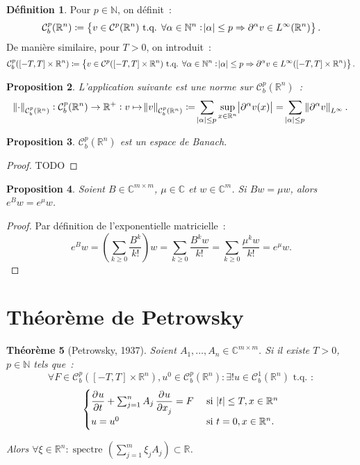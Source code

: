 \documentclass{report}
\DeclareMathOperator{\spectreOperator}{spectre\!}
\newcommand{\C}{{\mathbb C}}
\newcommand{\R}{{\mathbb R}}
\newcommand{\N}{{\mathbb N}}
\newcommand{\tq}{\text{ t.q. }}
\newcommand{\st}{\tq}
\newcommand{\pinfty}{{+\infty}}
\newcommand{\spectre}[1]{{\spectreOperator\left(#1\right)}}
\newtheorem{thm}{Théorème}[chapter]
\newtheorem{prp}[thm]{Proposition}
\theoremstyle{definition}
\newtheorem{déf}[thm]{Définition}
\theoremstyle{remark}
\begin{document}
\begin{déf} Pour $p \in \N$, on définit~:
\[\mathcal C^p_b(\R^n) \coloneqq \left\{v \in \mathcal C^p(\R^n) \st \forall \alpha \in \N^n : \abs \alpha \leq p \Rightarrow \partial^\alpha v \in L^\infty(\R^n)\right\}.\]
De manière similaire, pour $T > 0$, on introduit~:
\[\mathcal C^p_b([-T, T] \times \R^n) \coloneqq \left\{v \in \mathcal C^p([-T, T] \times \R^n) \st \forall \alpha \in \N^n : \abs \alpha \leq p \Rightarrow \partial^\alpha v \in L^\infty([-T, T] \times \R^n)\right\}.\]
\end{déf}

\begin{prp} L'application suivante est une norme sur $\mathcal C^p_b(\R^n)$~:
\[\norm \cdot_{\mathcal C^p_b(\R^n)} : \mathcal C^p_b(\R^n) \to \R^+ : v \mapsto \norm v_{\mathcal C^p_b(\R^n)} \coloneqq \sum_{\abs \alpha \leq p}\sup_{x \in \R^n}\abs {\partial^\alpha v(x)}
= \sum_{\abs\alpha \leq p}\norm {\partial^\alpha v}_{L^\infty}.\]
\end{prp}

\begin{prp}\label{prp:C^p_b Banach} $\mathcal C^p_b(\R^n)$ est un espace de Banach.
\end{prp}

\begin{proof}
TODO
\end{proof}

\begin{prp} Soient $B \in \C^{m \times m}$, $\mu \in \C$ et $w \in \C^m$. Si $Bw = \mu w$, alors $e^Bw = e^\mu w$.
\end{prp}

\begin{proof} Par définition de l'exponentielle matricielle~:
\[e^Bw = \left(\sum_{k \geq 0}\frac {B^k}{k!}\right)w = \sum_{k \geq 0}\frac {B^kw}{k!} = \sum_{k \geq 0}\frac {\mu^kw}{k!} = e^\mu w.\]
\end{proof}

\section{Théorème de Petrowsky}
\begin{thm}[Petrowsky, 1937] Soient $A_1, \ldots, A_n \in \C^{m \times m}$. Si il existe $T > 0$, $p \in \N$ tels que~:
\[\forall F \in \mathcal C^p_b([-T, T] \times \R^n), u^0 \in \mathcal C^p_b(\R^n) : \exists! u \in \mathcal C^1_b(\R^n) \st:\]
\[\begin{cases}\dpd ut + \sum_{j=1}^nA_j\dpd u{x_j} = F & \text{ si } \abs t \leq T, x \in \R^n\\u=u^0 &\text{ si }t=0, x \in \R^n.\end{cases}\]

Alors $\forall \xi \in \R^n : \spectre {\sum_{j=1}^m\xi_j A_j} \subset \R$.
\end{thm}
\end{document}
